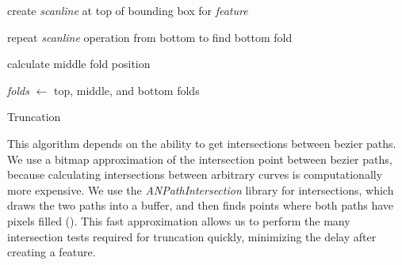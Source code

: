 \begin{algorithm}[H]



create \textit{scanline} at top of bounding box for \textit{feature}

 
repeat \textit{scanline} operation from bottom to find bottom fold
    
calculate middle fold position
    
\textit{folds} $\leftarrow$ top, middle, and bottom folds
    

\caption{Truncation}
\end{algorithm}

This algorithm depends on the ability to get intersections between
bezier paths. We use a bitmap approximation of the intersection point
between bezier paths, because calculating intersections between
arbitrary curves is computationally more expensive. We use the
\emph{ANPathIntersection} library for intersections, which draws the two
paths into a buffer, and then finds points where both paths have pixels
filled (\citet{ANPathIntersection}). This fast approximation allows us
to perform the many intersection tests required for truncation quickly,
minimizing the delay after creating a feature.

